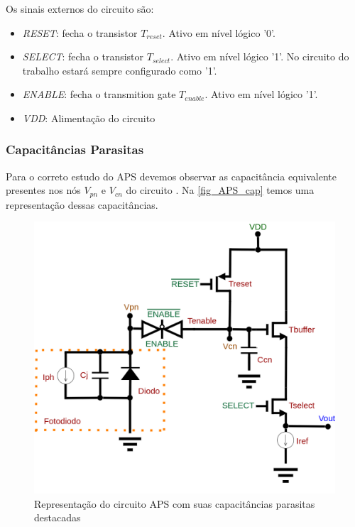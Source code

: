     Os sinais externos do circuito são:
    
\begin{itemize}
    \item \textit{RESET}: fecha o transistor $T_{reset}$. Ativo em n\'ivel l\'ogico '0'.
     \item \textit{SELECT}: fecha o transistor $T_{select}$. Ativo em n\'ivel l\'ogico '1'. No circuito do trabalho estar\'a sempre configurado como '1'.
     \item \textit{ENABLE}: fecha o transmition gate $T_{enable}$. Ativo em n\'ivel l\'ogico '1'.
     \item \textit{VDD}: Alimentação do circuito
\end{itemize}

\subsubsection{Capacit\^ancias Parasitas}
Para o correto estudo do APS devemos observar as capacit\^ancia equivalente presentes nos n\'os $V_{pn}$ e $V_{cn}$ do circuito \cite{LidianeCampos}. Na \autoref{fig_APS_cap} temos uma representação dessas capacit\^ancias.

\begin{figure}[htb]
	\caption{\label{fig_APS_cap}Representação do circuito APS com suas capacit\^ancias parasitas destacadas}
	\begin{center}
	    \includegraphics[scale=0.3]{Circuitos/APS_cap.png}
	\end{center}
\end{figure}

